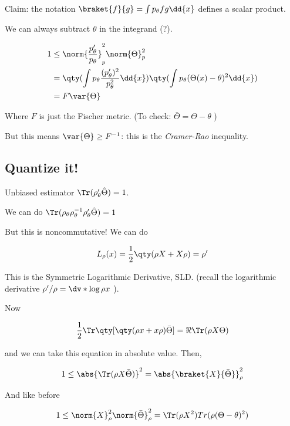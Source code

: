 Claim: the notation \( \braket{f}{g} = \int  p_\theta f g \dd{x}  \) defines a scalar product.

We can always subtract \( \theta \) in the integrand (?).

\begin{align}
  1 &\leq \norm{\frac{p_\theta '}{p_\theta}}^{2}_p \norm{\Theta}^2_p  \\
  &= \qty(\int  p_\theta \frac{(p_\theta ')^2}{p_\theta^2} \dd{x} )
  \qty(\int p_\theta (\Theta(x) - \theta)^2 \dd{x} )  \\
  &= F \var{\Theta}
\end{align}

Where \( F \) is just the Fischer metric. (To check: \( \bar{\Theta} = \Theta - \theta \) )

But this means \(\var{\Theta} \geq F ^{-1} \): this is the \emph{Cramer-Rao} inequality.

\subsection{Quantize it!}

Unbiased estimator \( \Tr (\rho_\theta ' \hat{\Theta}) = 1 \).

We can do \( \Tr (\rho_\theta \rho_\theta ^{-1} \rho_\theta ' \hat{\Theta}) = 1 \)

But this is noncommutative! We can do

\begin{equation} \label{eq:SLD-def}
  L_\rho (x)  = \frac{1}{2} \qty(\rho X + X \rho) = \rho'
\end{equation}

This is the Symmetric Logarithmic Derivative, SLD.
(recall the logarithmic derivative \( \rho' / \rho = \dv*{\log \rho}{x} \) ).

Now

\begin{equation}
  \frac{1}{2} \Tr \qty[\qty(\rho x + x \rho) \bar{\Theta}] = \Re \Tr (\rho X \Theta)
\end{equation}

and we can take this equation in absolute value. Then,

\begin{equation}
  1 \leq \abs{\Tr (\rho X \bar{\Theta})}^{2} = \abs{\braket{X}{\bar{\Theta}}}^{2}_{\rho}
\end{equation}

And like before

\begin{equation}
  1 \leq \norm{X}^{2} _{\rho}  \norm{\bar{\Theta}}^{2} _{\rho}
  = \Tr (\rho X^2 ) Tr(\rho (\Theta - \theta)^2)
\end{equation}

